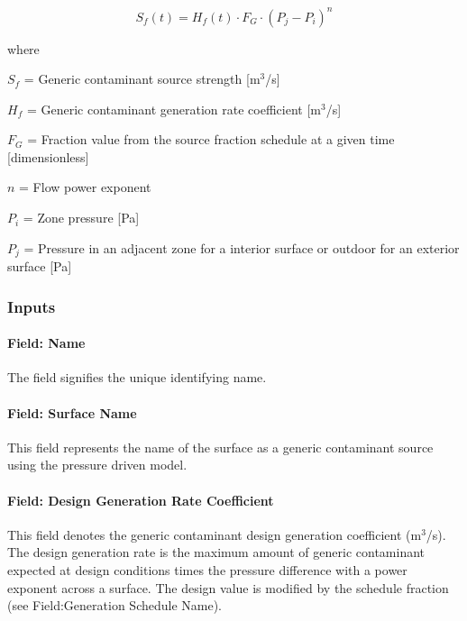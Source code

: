 \begin{equation}
{S_f}(t) = {H_f}(t)\cdot{F_G}\cdot{\left( {{P_j} - {P_i}} \right)^n}
\end{equation}

where

$S_{f}$ = Generic contaminant source strength {[}m\(^{3}\)/s{]}

$H_{f}$ = Generic contaminant generation rate coefficient {[}m\(^{3}\)/s{]}

$F_{G}$ = Fraction value from the source fraction schedule at a given time {[}dimensionless{]}

${n}$ = Flow power exponent

$P_{i}$ = Zone pressure {[}Pa{]}

$P_{j}$ = Pressure in an adjacent zone for a interior surface or outdoor for an exterior surface {[}Pa{]}

\subsubsection{Inputs}\label{inputs-12-007}

\paragraph{Field: Name}\label{field-name-12-005}

The field signifies the unique identifying name.

\paragraph{Field: Surface Name}\label{field-surface-name-2-000}

This field represents the name of the surface as a generic contaminant source using the pressure driven model.

\paragraph{Field: Design Generation Rate Coefficient}\label{field-design-generation-rate-coefficient}

This field denotes the generic contaminant design generation coefficient (m\(^{3}\)/s). The design generation rate is the maximum amount of generic contaminant expected at design conditions times the pressure difference with a power exponent across a surface. The design value is modified by the schedule fraction (see Field:Generation Schedule Name).

